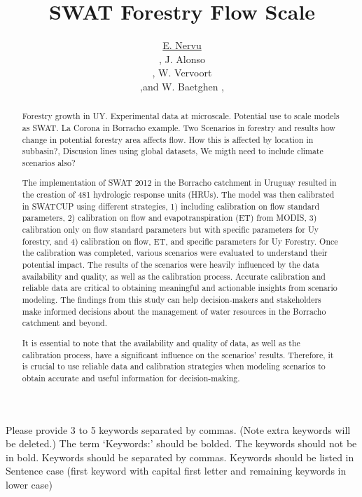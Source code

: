 \documentclass[a4paper,fleqn]{article} %
\title{SWAT Forestry Flow Scale} %
\author{\underline{E. Nervu} %
 \address[A1]{\it{FPTA 358, INIA Uruguay }} \orcid{0000-0000-0000-0000}, J. Alonso \address[B1]{\it{Universidad de la República, GPO Box 987, Somewhere else, SomeCountry}}, W. Vervoort \address[C1]{\it{The University of Sydney, GPO Box 987, Somewhere else, SomeCountry}},and W. Baetghen \addressmark[D1],\address[D1]{\it{IRI Columbia, GPO Box 987, Somewhere else, SomeCountry}}
}
\begin{document}
\begin{abstract}

Forestry growth in UY. Experimental data at microscale. Potential use to scale models as SWAT. La Corona in Borracho example. Two Scenarios in forestry and results how change in potential forestry area affects flow. How this is affected by location in subbasin?, Discusion lines using global datasets, We migth need to include climate scenarios also?


The implementation of SWAT 2012 in the Borracho catchment in Uruguay resulted in the creation of 481 hydrologic response units (HRUs). The model was then calibrated in SWATCUP using different strategies, 1) including calibration on flow standard parameters, 2) calibration on flow and evapotranspiration (ET) from MODIS, 3) calibration only on flow standard parameters but with specific parameters for Uy forestry, and 4) calibration on flow, ET, and specific parameters for Uy Forestry. Once the calibration was completed, various scenarios were evaluated to understand their potential impact. The results of the scenarios were heavily influenced by the data availability and quality, as well as the calibration process.  Accurate calibration and reliable data are critical to obtaining meaningful and actionable insights from scenario modeling. The findings from this study can help decision-makers and stakeholders make informed decisions about the management of water resources in the Borracho catchment and beyond.

 It is essential to note that the availability and quality of data, as well as the calibration process, have a significant influence on the scenarios' results. Therefore, it is crucial to use reliable data and calibration strategies when modeling scenarios to obtain accurate and useful information for decision-making.
 
\end{abstract}

\begin{keyword}
Please provide 3 to 5 keywords separated by commas. (Note extra keywords will be deleted.) The term ‘Keywords:’ should be bolded. The keywords should not be in bold. Keywords should be separated by commas. Keywords should be listed in Sentence case (first keyword with capital first letter and remaining keywords in lower case)
\end{keyword}

\maketitle





	
\end{document}
